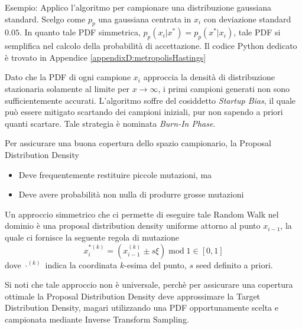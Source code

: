 Esempio: Applico l'algoritmo per campionare una distribuzione gaussiana standard. Scelgo come $p_p$ una gaussiana centrata in $x_i$ con 
deviazione standard $0.05$. In quanto tale PDF simmetrica, \mbox{$p_p(x_i|x^*)=p_p(x^*|x_i)$}, tale PDF si semplifica nel calcolo della probabilit\`a 
di accettazione. Il codice Python dedicato \`e trovato in Appendice \ref{appendixD:metropolisHastings}\par
Dato che la PDF di ogni campione $x_i$ approccia la densit\`a di distribuzione stazionaria solamente al limite per $x\to\infty$, i primi campioni
generati non sono sufficientemente accurati. L'algoritmo soffre del cosiddetto \textit{Startup Bias}, il quale pu\`o essere mitigato scartando 
dei campioni iniziali, pur non sapendo a priori quanti scartare. Tale strategia \`e nominata \textit{Burn-In Phase}.\par
Per assicurare una buona copertura dello spazio campionario, la Proposal Distribution Density
\begin{itemize}[topsep=0pt,noitemsep]
	\item Deve frequentemente restituire piccole mutazioni, ma
	\item Deve avere probabilit\`a non nulla di produrre grosse mutazioni\footnotemark{}
\end{itemize}
Un approccio simmetrico che ci permette di eseguire tale Random Walk nel dominio \`e una proposal distribution density uniforme attorno al punto 
$x_{i-1}$, la quale ci fornisce la seguente regola di mutazione
\begin{equation}
	x_i^{*(k)}=\left(x_{i-1}^{(k)}\pm s\xi\right)\operatorname{mod}1\in[0,1]
\end{equation}
dove $\cdot^{(k)}$ indica la coordinata $k$-esima del punto, $s$ seed definito a priori.\par
Si noti che tale approccio non \`e universale, perch\`e per assicurare una copertura ottimale la Proposal Distribution Density deve approssimare 
la Target Distribution Density, magari utilizzando una PDF opportunamente scelta e campionata mediante Inverse Transform Sampling.
